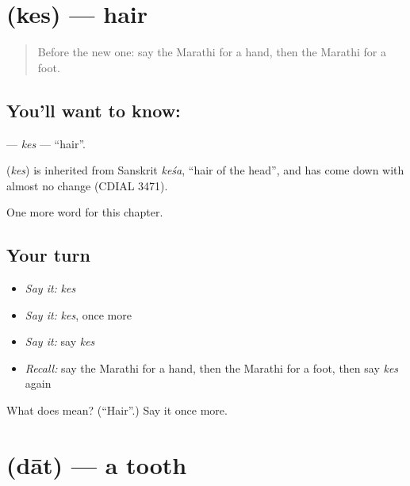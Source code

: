 \section[\texorpdfstring{\mr{केस} (kes)}{केस (kes)}]{ (kes) — hair}

\label{lesson:MR-C70-kes}



\begin{quote}
Before the new one: say the Marathi for a hand, then the Marathi for a foot.
\end{quote}

\subsection*{You'll want to know: }
\textbf{} — \emph{kes} — \textquotedblleft{}hair\textquotedblright{}.

\begin{cousinweb}
\textbf{} (\emph{kes}) is inherited from Sanskrit \emph{keśa}, \textquotedblleft{}hair of the head\textquotedblright{}, and has come down with almost no change (CDIAL 3471).
\end{cousinweb}

\begin{grammarlens}[title={What you've built}]
One more word for this chapter.
\end{grammarlens}

\subsection*{Your turn}
\begin{itemize}
\raggedright
  \item \emph{Say it:} \emph{kes}
  \item \emph{Say it:} \emph{kes}, once more
  \item \emph{Say it:} say \emph{kes}
  \item \emph{Recall:} say the Marathi for a hand, then the Marathi for a foot, then say \emph{kes} again
\end{itemize}

\begin{tcolorbox}[breakable,colback=teal!4,colframe=teal!35!black,title={Before you move on}]
What does  mean? (\textquotedblleft{}Hair\textquotedblright{}.) Say it once more.
\end{tcolorbox}
\section[\texorpdfstring{\mr{दात} (dāt)}{दात (dāt)}]{ (dāt) — a tooth}

